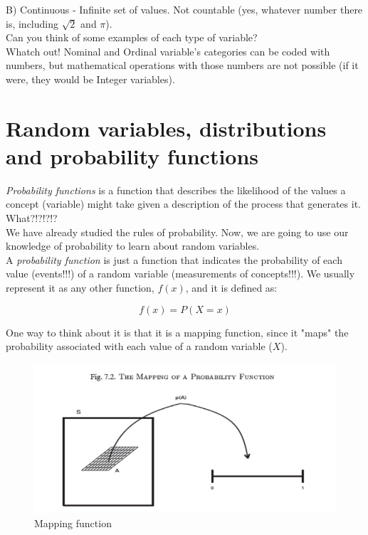 \documentclass[11pt]{article}
\begin{document}
	B) Continuous - Infinite set of values. Not countable (yes, whatever number there is, including $\sqrt{2} $ and $\pi$). \\

	Can you think of some examples of each type of variable?\\

	Whatch out! Nominal and Ordinal variable's categories can be coded with numbers, but mathematical operations with those numbers are not possible (if it were, they would be Integer variables).

\section*{Random variables, distributions and probability functions}

	\emph{Probability functions} is a function that describes the likelihood of the values a concept (variable) might take given a description of the process that generates it.\\
	
	What?!?!?!?\\

	We have already studied the rules of probability. Now, we are going to use our knowledge of probability to learn about random variables.\\
	
	A \emph{probability function} is just a function that indicates the probability of each value (events!!!) of a random variable (measurements of concepts!!!). We usually represent it as any other function, $f(x)$, and it is defined as:
	
	\[f(x) = P(X=x)\]
	
	One way to think about it is that it is a mapping function, since it "maps" the probability associated with each value of a random variable ($X$).\\	

\begin{figure}[htp]
\centering
\includegraphics[scale=0.70]{mapping.png}
\caption{Mapping function}
\label{}
\end{figure}	
\end{document}
